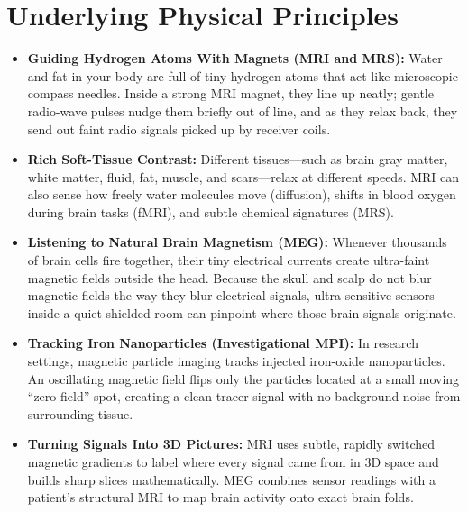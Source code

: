 \section{Underlying Physical Principles}
\begin{itemize}
  \item \textbf{Guiding Hydrogen Atoms With Magnets (MRI and MRS):} Water and fat in your body are full of tiny hydrogen atoms that act like microscopic compass needles. Inside a strong MRI magnet, they line up neatly; gentle radio-wave pulses nudge them briefly out of line, and as they relax back, they send out faint radio signals picked up by receiver coils.
  \item \textbf{Rich Soft-Tissue Contrast:} Different tissues---such as brain gray matter, white matter, fluid, fat, muscle, and scars---relax at different speeds. MRI can also sense how freely water molecules move (diffusion), shifts in blood oxygen during brain tasks (fMRI), and subtle chemical signatures (MRS).
  \item \textbf{Listening to Natural Brain Magnetism (MEG):} Whenever thousands of brain cells fire together, their tiny electrical currents create ultra-faint magnetic fields outside the head. Because the skull and scalp do not blur magnetic fields the way they blur electrical signals, ultra-sensitive sensors inside a quiet shielded room can pinpoint where those brain signals originate.
  \item \textbf{Tracking Iron Nanoparticles (Investigational MPI):} In research settings, magnetic particle imaging tracks injected iron-oxide nanoparticles. An oscillating magnetic field flips only the particles located at a small moving ``zero-field'' spot, creating a clean tracer signal with no background noise from surrounding tissue.
  \item \textbf{Turning Signals Into 3D Pictures:} MRI uses subtle, rapidly switched magnetic gradients to label where every signal came from in 3D space and builds sharp slices mathematically. MEG combines sensor readings with a patient's structural MRI to map brain activity onto exact brain folds.
\end{itemize}

